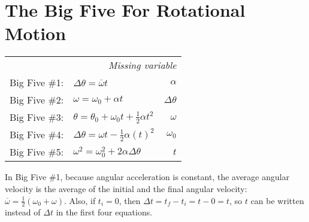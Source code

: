 \documentclass{article}
\begin{document}
\newpage
\section{The Big Five For Rotational Motion}

\begin{table}[!hbt]
    \begin{center}
      \setlength{\tabcolsep}{15pt}
      \renewcommand{\arraystretch}{1.5}
      \begin{tabular}{l l r}
        \multicolumn{3}{r}{\textit{Missing variable}} \\
        {Big Five \#1:} & $\Delta\theta = \overline{\omega}t$ & $\alpha$ \\
        {Big Five \#2:} & $\omega = \omega_{0} + \alpha{t}$ & $\Delta\theta$ \\
        {Big Five \#3:} & $\theta = \theta_{0} + \omega_{0}t + \frac{1}{2}\alpha{t}^{2}$ & $\omega$ \\
        {Big Five \#4:} & $\Delta\theta = \omega{t} - \frac{1}{2}\alpha(t)^{2}$ & $ \omega_{0}$ \\
        {Big Five \#5:} & $\omega^{2} = \omega_{0}^{2} + 2\alpha{\Delta}\theta$ & $t$ \\
    \end{tabular}
  \end{center} 
\end{table}

\begin{note}
    In Big Five \#1, because angular acceleration is constant, the average angular velocity is the average of the initial and the final angular velocity: $\overline{\omega} = \frac{1}{2}(\omega_{0}+\omega)$. 
    Also, if $t_{i} = 0$, then $\Delta t = t_{f} - t_{i} = t - 0 = t$, so $t$ can be written instead of $\Delta t$ in the first four equations.
\end{note}
\end{document}
